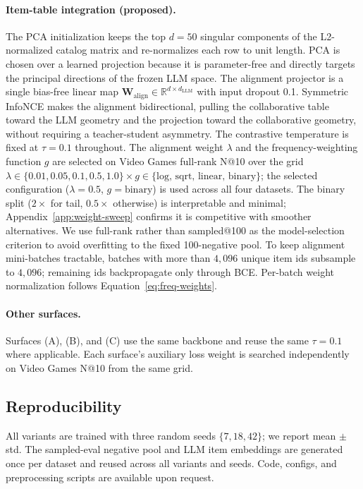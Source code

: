 \documentclass{article}
\begin{document}
\paragraph{Item-table integration (proposed).} The PCA initialization
keeps the top $d=50$ singular components of the L2-normalized
catalog matrix and re-normalizes each row to unit length. PCA is
chosen over a learned projection because it is parameter-free and
directly targets the principal directions of the frozen LLM space.
The alignment projector is a single bias-free linear map
$\mathbf{W}_{\!\text{align}} \in \mathbb{R}^{d \times d_\text{LLM}}$
with input dropout 0.1. Symmetric InfoNCE makes the alignment
bidirectional, pulling the collaborative table toward the LLM
geometry and the projection toward the collaborative geometry,
without requiring a teacher-student asymmetry. The contrastive
temperature is fixed at $\tau = 0.1$ throughout. The alignment weight $\lambda$
and the frequency-weighting function $g$ are selected on
Video Games full-rank N@10 over the grid
$\lambda \in \{0.01, 0.05, 0.1, 0.5, 1.0\} \times g \in \{\text{log,
sqrt, linear, binary}\}$; the selected configuration ($\lambda =
0.5$, $g = \text{binary}$) is used across all four datasets. The
binary split ($2\times$ for tail, $0.5\times$ otherwise) is
interpretable and minimal; Appendix~\ref{app:weight-sweep} confirms
it is competitive with smoother alternatives. We use full-rank
rather than sampled@100 as the model-selection criterion to avoid
overfitting to the fixed 100-negative pool. To keep alignment
mini-batches tractable, batches with more than $4{,}096$ unique
item ids subsample to $4{,}096$; remaining ids backpropagate only
through BCE. Per-batch weight normalization follows
Equation~\ref{eq:freq-weights}.

\paragraph{Other surfaces.} Surfaces (A), (B), and (C) use the
same backbone and reuse the same $\tau = 0.1$ where applicable.
Each surface's auxiliary loss weight is searched independently on
Video Games N@10 from the same grid.

\subsection{Reproducibility}
\label{sec:reproducibility}

All variants are trained with three random seeds $\{7, 18, 42\}$;
we report mean $\pm$ std. The sampled-eval negative pool and LLM
item embeddings are generated once per dataset and reused across
all variants and seeds. Code, configs, and preprocessing scripts
are available upon request.
\end{document}
